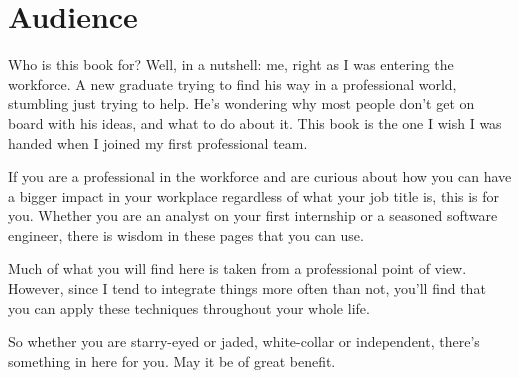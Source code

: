 \chapter{Audience}

Who is this book for? Well, in a nutshell: me, right as I was entering the workforce. 
A new graduate trying to find his way in a professional world, stumbling just trying to help. He's wondering 
why most people don't get on board with his ideas, and what to do about it. This book is the one I wish 
I was handed when I joined my first professional team.

If you are a professional in the workforce and are curious about how you can have a bigger impact
in your workplace regardless of what your job title is, this is for you. Whether you are an analyst
on your first internship or a seasoned software engineer, there is wisdom in these pages that you
can use.

Much of what you will find here is taken from a professional point of view. However, since I tend to
integrate things more often than not, you'll find that you can apply these techniques throughout your
whole life.

So whether you are starry-eyed or jaded, white-collar or independent, there's something in here
for you. May it be of great benefit.